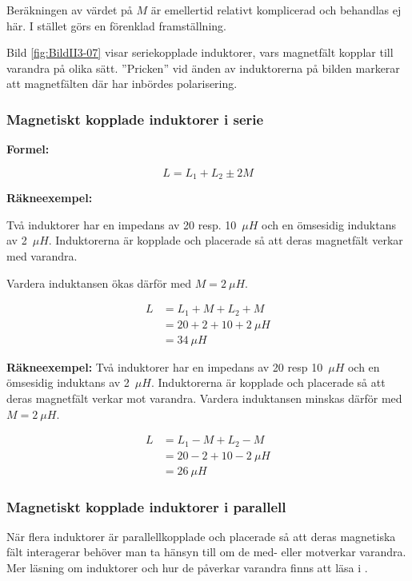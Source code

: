 Beräkningen av värdet på \(M\) är emellertid relativt komplicerad och behandlas
ej här.
I stället görs en förenklad framställning.

Bild \ref{fig:BildII3-07} visar seriekopplade induktorer, vars magnetfält
kopplar till varandra på olika sätt.
''Pricken'' vid änden av induktorerna på bilden markerar att magnetfälten där
har inbördes polarisering.

\subsubsection{Magnetiskt kopplade induktorer i serie}

\textbf{Formel:}

\[L = L_1 +L_2 \pm 2M\]

\textbf{Räkneexempel:}

Två induktorer har en impedans av 20 resp. 10~\(\mu H\) och en ömsesidig
induktans av 2~\(\mu H\).
Induktorerna är kopplade och placerade så att deras magnetfält verkar med
varandra.

Vardera induktansen ökas därför med \(M = 2\ \mu H\).

\begin{align*}
  L &= L_1 + M + L_2 + M \\
  &= 20 + 2 + 10 + 2\ \mu H \\
  &= 34\ \mu H
\end{align*}

\textbf{Räkneexempel:}
Två induktorer har en impedans av 20 resp 10~\(\mu H\) och en ömsesidig
induktans av 2~\(\mu H\).
Induktorerna är kopplade och placerade så att deras magnetfält verkar mot
varandra.
Vardera induktansen minskas därför med \(M = 2\ \mu H\).

\begin{align*}
  L &= L_1 - M + L_2 - M \\
  & = 20 - 2 + 10 - 2\ \mu H \\
  &= 26\ \mu H
\end{align*}

\subsubsection{Magnetiskt kopplade induktorer i parallell}
När flera induktorer är parallellkopplade och placerade så att deras magnetiska
fält interagerar behöver man ta hänsyn till om de med- eller motverkar varandra.
Mer läsning om induktorer och hur de påverkar varandra finns att läsa i
\cite{letrafo}.

